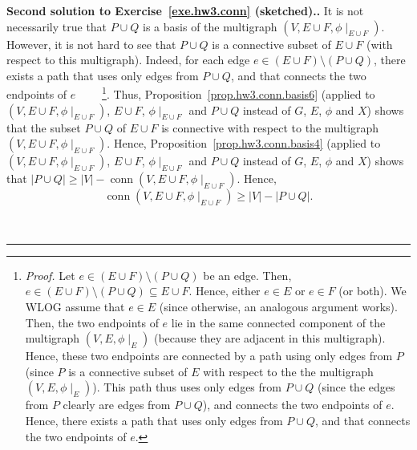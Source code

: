 \documentclass[numbers=enddot,12pt,final,onecolumn,notitlepage]{scrartcl}%
\theoremstyle{definition}
\newenvironment{proof}[1][Proof]{\noindent\textbf{#1.} }{\ \rule{0.5em}{0.5em}}
\newcommand{\conn}{\operatorname{conn}}
\newcommand{\abs}[1]{\left| #1 \right|}
\newcommand{\tup}[1]{\left( #1 \right)}
\begin{document}
\begin{proof}[Second solution to Exercise~\ref{exe.hw3.conn}
 (sketched).]
It is not necessarily true that $P \cup Q$ is a basis of
the multigraph $\tup{V, E \cup F, \phi\mid_{E \cup F}}$.
However, it is not hard to see that $P \cup Q$ is a
connective subset of $E \cup F$ (with respect to this
multigraph).
Indeed, for each edge
$e \in \tup{E \cup F} \setminus \tup{P \cup Q}$,
there exists a path that uses only edges from $P \cup Q$,
and that connects the two endpoints of $e$
\ \ \ \ \footnote{\textit{Proof.} Let
  $e \in \tup{E \cup F} \setminus \tup{P \cup Q}$ be an edge.
  Then,
  $e \in \tup{E \cup F} \setminus \tup{P \cup Q}
     \subseteq E \cup F$.
  Hence, either $e \in E$ or $e \in F$ (or both).
  We WLOG assume that $e \in E$ (since otherwise, an analogous
  argument works).
  Then, the two endpoints of $e$ lie in the same connected
  component of the multigraph $\tup{V, E, \phi\mid_E}$
  (because they are adjacent in this multigraph).
  Hence, these two endpoints are connected by a path
  using only edges from $P$ (since $P$ is a connective
  subset of $E$ with respect to the
  the multigraph $\tup{V, E, \phi\mid_E}$).
  This path thus uses only edges from $P \cup Q$ (since
  the edges from $P$ clearly are edges from $P \cup Q$),
  and connects the two endpoints of $e$.
  Hence, there exists a path that uses only edges from $P \cup Q$,
  and that connects the two endpoints of $e$.}.
Thus, Proposition~\ref{prop.hw3.conn.basis6} (applied to
$\tup{V, E \cup F, \phi\mid_{E \cup F}}$, $E \cup F$,
$\phi\mid_{E \cup F}$ and $P \cup Q$ instead of $G$,
$E$, $\phi$ and $X$) shows that the subset $P \cup Q$ of
$E \cup F$ is connective with respect to the multigraph
$\tup{V, E \cup F, \phi\mid_{E \cup F}}$. Hence,
Proposition~\ref{prop.hw3.conn.basis4} (applied to
$\tup{V, E \cup F, \phi\mid_{E \cup F}}$, $E \cup F$,
$\phi\mid_{E \cup F}$ and $P \cup Q$ instead of $G$,
$E$, $\phi$ and $X$) shows that
$\abs{P \cup Q}
\geq \abs{V}
- \conn \tup{V, E \cup F, \phi\mid_{E \cup F}}$.
Hence,
\begin{equation}
\conn \tup{V, E \cup F, \phi\mid_{E \cup F}}
\geq \abs{V} - \abs{P \cup Q} .
\label{sol.hw3.conn.2nd.1}
\end{equation}


\end{proof}
\end{document}
